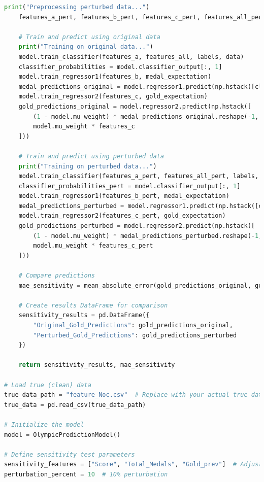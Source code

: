 \documentclass[12pt]{article}
\begin{document}
\begin{lstlisting}[language=Python, style=mystyle, caption=robust\_sensitivity.ipynb]
    print("Preprocessing perturbed data...")
    features_a_pert, features_b_pert, features_c_pert, features_all_pert, _, _, _ = model.preprocess_data(perturbed_data)

    # Train and predict using original data
    print("Training on original data...")
    model.train_classifier(features_a, features_all, labels, data)
    classifier_probabilities = model.classifier_output[:, 1]
    model.train_regressor1(features_b, medal_expectation)
    medal_predictions_original = model.regressor1.predict(np.hstack([classifier_probabilities.reshape(-1, 1), features_b]))
    model.train_regressor2(features_c, gold_expectation)
    gold_predictions_original = model.regressor2.predict(np.hstack([
        (1 - model.mu_weight) * medal_predictions_original.reshape(-1, 1),
        model.mu_weight * features_c
    ]))

    # Train and predict using perturbed data
    print("Training on perturbed data...")
    model.train_classifier(features_a_pert, features_all_pert, labels, perturbed_data)
    classifier_probabilities_pert = model.classifier_output[:, 1]
    model.train_regressor1(features_b_pert, medal_expectation)
    medal_predictions_perturbed = model.regressor1.predict(np.hstack([classifier_probabilities_pert.reshape(-1, 1), features_b_pert]))
    model.train_regressor2(features_c_pert, gold_expectation)
    gold_predictions_perturbed = model.regressor2.predict(np.hstack([
        (1 - model.mu_weight) * medal_predictions_perturbed.reshape(-1, 1),
        model.mu_weight * features_c_pert
    ]))

    # Compare predictions
    mae_sensitivity = mean_absolute_error(gold_predictions_original, gold_predictions_perturbed)

    # Create results DataFrame for comparison
    sensitivity_results = pd.DataFrame({
        "Original_Gold_Predictions": gold_predictions_original,
        "Perturbed_Gold_Predictions": gold_predictions_perturbed
    })

    return sensitivity_results, mae_sensitivity

# Load true (clean) data
true_data_path = "feature_Noc.csv"  # Replace with your actual true data path
true_data = pd.read_csv(true_data_path)

# Initialize the model
model = OlympicPredictionModel()

# Define sensitivity test parameters
sensitivity_features = ["Score", "Total_Medals", "Gold_prev"]  # Adjust based on actual dataset columns
perturbation_percent = 10  # 10% perturbation


\end{lstlisting}
\end{document}
